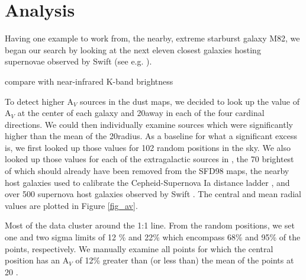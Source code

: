 \documentclass[twocolumn]{aastex61}
\begin{document}
\section{Analysis} \label{sec_analysis}
  

Having one example to work from, the nearby, extreme starburst galaxy M82, we began our search by looking at the next eleven closest galaxies hosting supernovae observed by Swift (see e.g. \citealp{Brown_etal_2015_10}).  

compare with near-infrared K-band brightness




To detect higher A$_V$ sources in the dust maps, we decided to look up the value of A$_V$ at the center of each galaxy and 20\arcmin away in each of the four cardinal directions.  We could then individually examine sources which were significantly higher than the mean of the 20\arcmin radius.  As a baseline for what a significant excess is, we first looked up those values for 102 random positions in the sky.  
We also looked up those values for each of the extragalactic sources in \citet{Rice_etal_1998}, the 70 brightest of which should already have been removed from the SFD98 maps, the nearby host galaxies used to calibrate the Cepheid-Supernova Ia distance ladder \citep{Riess_etal_2016}, and over 500 supernova host galaxies observed by Swift \citep{Brown_etal_2014_SOUSA}.  
The central and mean radial values are plotted in Figure \ref{fig_av}.  

Most of the data cluster around the 1:1 line.  From the random positions, we set one and two sigma limits of 12 \% and 22\% which encompass 68\% and 95\% of the points, respectively.  We manually examine all points for which the central position has an A$_V$ of 12\% greater than (or less than) the mean of the points at 20 \arcmin.  






\begin{figure*}
\caption{The central value of A$_V$ is plotted with respect to the mean of the A$_V$ values 20\arcmin away in each of the four cardinal directions.  102 random positions are plotted in grey.  The sample from \citet{Rice_etal_1998} which should have already been removed are blue triangles.  Nearby galaxies used to calibrate the Cepheid-SN distance ladder \citep{Riess_etal_2016} are plotted as red triangles.  The sample of Swift supernovae that I care about are green triangles.  A 1:1 line shows perfect agreement between the values.
\label{fig_av}}
\end{figure*}
\end{document}
